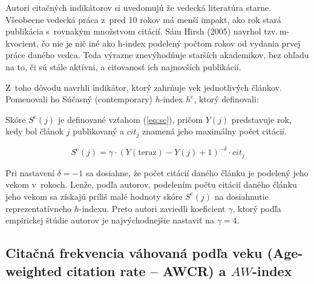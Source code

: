 Autori citačných indikátorov si uvedomujú že vedecká literatúra starne.
Všeobecne vedecká práca z~pred 10 rokov má menší impakt, ako rok stará
publikácia s~rovnakým množstvom citácií.  Sám Hirsh (2005) navrhol
tzv.\,m-kvocient, čo nie je nič iné ako h-index podelený počtom rokov od vydania
prvej práce daného vedca.  Teda výrazne znevýhodňuje starších akademikov, bez
ohľadu na to, či sú stále aktívni, a citovanosť ich najnovších publikácií.

Z~toho dôvodu \citet{Sidiropoulos2007} navrhli indikátor, ktorý zahrňuje vek
jednotlivých článkov.  Pomenovali ho Súčasný (contemporary) $h$-index
$h^{\mathrm{c}}$, ktorý definovali:


Skóre $S^{\mathrm{c}}(j)$ je definované vzťahom (\ref{eq:sc}), pričom $Y(j)$
predstavuje rok, kedy bol článok $j$ publikovaný a $\mathit{cit}_j$ znamená jeho
maximálny počet citácií.

\begin{equation}
\label{eq:sc}
S^{\mathrm{c}}(j) = \gamma\cdot (Y(\mathrm{teraz}) - Y(j) + 1)^{-\delta}\cdot \mathit{cit}_j
\end{equation}

Pri nastavení $\delta = -1$ sa dosiahne, že počet citácií daného článku je
podelený jeho vekom v~rokoch.  Lenže, podľa autorov, podelením počtu citácií
daného článku jeho vekom sa získajú príliš malé hodnoty skóre
$S^{\mathrm{c}}(j)$ na dosiahnutie reprezentatívneho $h$-indexu.  Preto autori
zaviedli koeficient $\gamma$, ktorý podľa empirickej štúdie autorov je
najvýchodnejšie nastaviť na $\gamma = 4$.

\subsection{Citačná frekvencia váhovaná podľa veku (Age-weighted citation rate
  -- AWCR) a $\mathit{AW}$-index}

